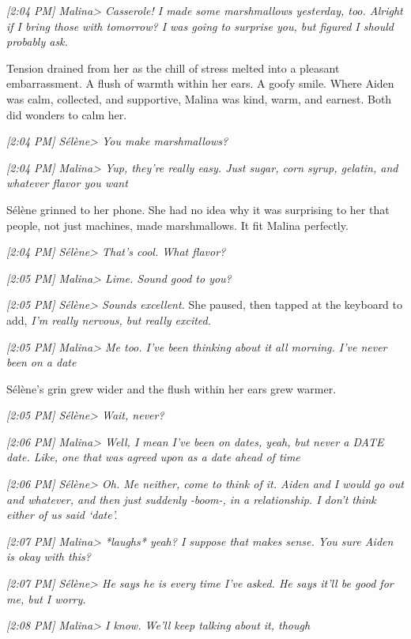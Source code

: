 \emph{{[}2:04 PM{]} Malina\textgreater{} Casserole! I made some marshmallows yesterday, too. Alright if I bring those with tomorrow? I was going to surprise you, but figured I should probably ask.}

Tension drained from her as the chill of stress melted into a pleasant embarrassment. A flush of warmth within her ears. A goofy smile. Where Aiden was calm, collected, and supportive, Malina was kind, warm, and earnest. Both did wonders to calm her.

\emph{{[}2:04 PM{]} Sélène\textgreater{} You make marshmallows?}

\emph{{[}2:04 PM{]} Malina\textgreater{} Yup, they're really easy. Just sugar, corn syrup, gelatin, and whatever flavor you want}

Sélène grinned to her phone. She had no idea why it was surprising to her that people, not just machines, made marshmallows. It fit Malina perfectly.

\emph{{[}2:04 PM{]} Sélène\textgreater{} That's cool. What flavor?}

\emph{{[}2:05 PM{]} Malina\textgreater{} Lime. Sound good to you?}

\emph{{[}2:05 PM{]} Sélène\textgreater{} Sounds excellent.} She paused, then tapped at the keyboard to add, \emph{I'm really nervous, but really excited.}

\emph{{[}2:05 PM{]} Malina\textgreater{} Me too. I've been thinking about it all morning. I've never been on a date}

Sélène's grin grew wider and the flush within her ears grew warmer.

\emph{{[}2:05 PM{]} Sélène\textgreater{} Wait, never?}

\emph{{[}2:06 PM{]} Malina\textgreater{} Well, I mean I've been on dates, yeah, but never a DATE date. Like, one that was agreed upon as a date ahead of time}

\emph{{[}2:06 PM{]} Sélène\textgreater{} Oh. Me neither, come to think of it. Aiden and I would go out and whatever, and then just suddenly -boom-, in a relationship. I don't think either of us said `date'.}

\emph{{[}2:07 PM{]} Malina\textgreater{} *laughs* yeah? I suppose that makes sense. You sure Aiden is okay with this?}

\emph{{[}2:07 PM{]} Sélène\textgreater{} He says he is every time I've asked. He says it'll be good for me, but I worry.}

\emph{{[}2:08 PM{]} Malina\textgreater{} I know. We'll keep talking about it, though}

